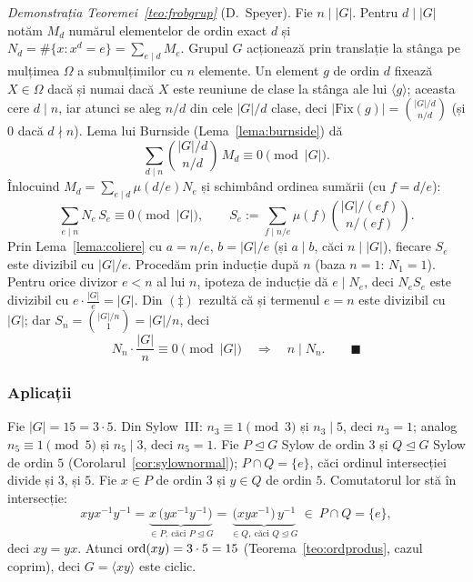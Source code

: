 \emph{Demonstrația Teoremei~\ref{teo:frobgrup}} (D.~Speyer). Fie $n\mid|G|$. Pentru $d\mid|G|$ notăm $M_d$ numărul elementelor de ordin exact $d$ și $N_d=\#\{x:x^d=e\}=\sum_{e\mid d}M_e$. Grupul $G$ acționează prin translație la stânga pe mulțimea $\Omega$ a submulțimilor cu $n$ elemente. Un element $g$ de ordin $d$ fixează $X\in\Omega$ dacă și numai dacă $X$ este reuniune de clase la stânga ale lui $\langle g\rangle$; aceasta cere $d\mid n$, iar atunci se aleg $n/d$ din cele $|G|/d$ clase, deci $|\mathrm{Fix}(g)|=\binom{|G|/d}{n/d}$ (și $0$ dacă $d\nmid n$). Lema lui Burnside (Lema~\ref{lema:burnside}) dă
\[
\sum_{d\mid n}\binom{|G|/d}{n/d}\,M_d\equiv0\pmod{|G|}.\tag{$\dagger$}
\]
Înlocuind $M_d=\sum_{e\mid d}\mu(d/e)N_e$ și schimbând ordinea sumării (cu $f=d/e$):
\[
\sum_{e\mid n}N_e\,S_e\equiv0\pmod{|G|},\qquad S_e:=\sum_{f\mid n/e}\mu(f)\binom{|G|/(ef)}{n/(ef)}.\tag{$\ddagger$}
\]
Prin Lema~\ref{lema:coliere} cu $a=n/e$, $b=|G|/e$ (și $a\mid b$, căci $n\mid|G|$), fiecare $S_e$ este divizibil cu $|G|/e$. Procedăm prin inducție după $n$ (baza $n=1$: $N_1=1$). Pentru orice divizor $e<n$ al lui $n$, ipoteza de inducție dă $e\mid N_e$, deci $N_eS_e$ este divizibil cu $e\cdot\frac{|G|}{e}=|G|$. Din $(\ddagger)$ rezultă că și termenul $e=n$ este divizibil cu $|G|$; dar $S_n=\binom{|G|/n}{1}=|G|/n$, deci
\[
N_n\cdot\frac{|G|}{n}\equiv0\pmod{|G|}\quad\Longrightarrow\quad n\mid N_n.\qquad\blacksquare
\]

\subsubsection*{Aplicații}

\begin{aplicatie}\label{apl:15}
Fie $|G|=15=3\cdot5$. Din Sylow~III: $n_3\equiv1\pmod3$ și $n_3\mid5$, deci $n_3=1$; analog $n_5\equiv1\pmod5$ și $n_5\mid3$, deci $n_5=1$. Fie $P\trianglelefteq G$ Sylow de ordin $3$ și $Q\trianglelefteq G$ Sylow de ordin $5$ (Corolarul~\ref{cor:sylownormal}); $P\cap Q=\{e\}$, căci ordinul intersecției divide și $3$, și $5$. Fie $x\in P$ de ordin $3$ și $y\in Q$ de ordin $5$. Comutatorul lor stă în intersecție:
\[
xyx^{-1}y^{-1}=\underbrace{x\,\bigl(yx^{-1}y^{-1}\bigr)}_{\in P,\ \text{căci }P\trianglelefteq G}=\underbrace{\bigl(xyx^{-1}\bigr)\,y^{-1}}_{\in Q,\ \text{căci }Q\trianglelefteq G}\ \in\ P\cap Q=\{e\},
\]
deci $xy=yx$. Atunci $\operatorname{ord}(xy)=3\cdot5=15$ (Teorema~\ref{teo:ordprodus}, cazul coprim), deci $G=\langle xy\rangle$ este ciclic.
\end{aplicatie}


